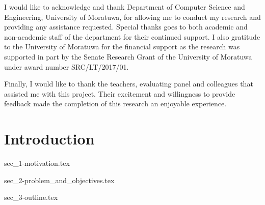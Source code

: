 \documentclass[a4paper,oneside,12pt]{report}
\begin{document}
I would like to acknowledge and thank Department of Computer Science and Engineering, University of Moratuwa, for allowing me to conduct my research and providing any assistance requested. Special thanks goes to both academic and non-academic staff of the department for their continued support. I also gratitude to the University of Moratuwa for the financial support as the research was supported in part by the Senate Research Grant of the University of Moratuwa under award number SRC/LT/2017/01.

Finally, I would like to thank the teachers, evaluating panel and colleagues that assisted me with this project. Their excitement and willingness to provide feedback made the completion of this research an enjoyable experience.

\tableofcontents

\listoffigures

\listoftables


\printglossary[style=custom-glossary-style, type=\acronymtype, title=List of Abbreviations, toctitle=List of Abbreviations, nonumberlist]

\chapter{Introduction}
\label{ch:intro}

{sec_1-motivation.tex}

{sec_2-problem_and_objectives.tex}

{sec_3-outline.tex}

\end{document}
